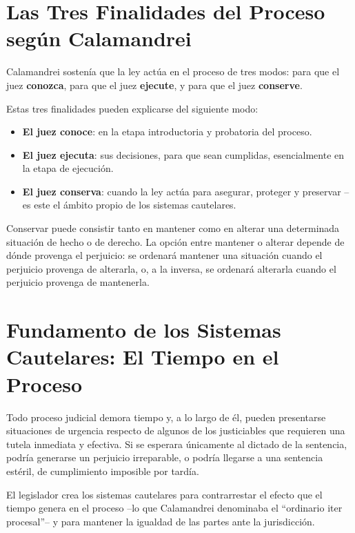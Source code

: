 \documentclass[12pt,oneside]{book}
\begin{document}
\section{Las Tres Finalidades del Proceso según Calamandrei}

\begin{important}
Calamandrei sostenía que la ley actúa en el proceso de tres modos: para que el juez \textbf{conozca}, para que el juez \textbf{ejecute}, y para que el juez \textbf{conserve}.
\end{important}

Estas tres finalidades pueden explicarse del siguiente modo:
\begin{itemize}
    \item \textbf{El juez conoce}: en la etapa introductoria y probatoria del proceso.
    \item \textbf{El juez ejecuta}: sus decisiones, para que sean cumplidas, esencialmente en la etapa de ejecución.
    \item \textbf{El juez conserva}: cuando la ley actúa para asegurar, proteger y preservar --es este el ámbito propio de los sistemas cautelares.
\end{itemize}

Conservar puede consistir tanto en mantener como en alterar una determinada situación de hecho o de derecho. La opción entre mantener o alterar depende de dónde provenga el perjuicio: se ordenará mantener una situación cuando el perjuicio provenga de alterarla, o, a la inversa, se ordenará alterarla cuando el perjuicio provenga de mantenerla.

\section{Fundamento de los Sistemas Cautelares: El Tiempo en el Proceso}

Todo proceso judicial demora tiempo y, a lo largo de él, pueden presentarse situaciones de urgencia respecto de algunos de los justiciables que requieren una tutela inmediata y efectiva. Si se esperara únicamente al dictado de la sentencia, podría generarse un perjuicio irreparable, o podría llegarse a una sentencia estéril, de cumplimiento imposible por tardía.

\begin{important}
El legislador crea los sistemas cautelares para contrarrestar el efecto que el tiempo genera en el proceso --lo que Calamandrei denominaba el ``ordinario iter procesal''-- y para mantener la igualdad de las partes ante la jurisdicción.
\end{important}
\end{document}
